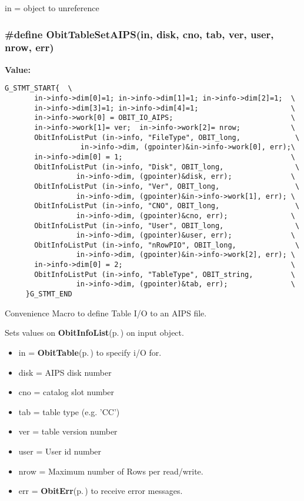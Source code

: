 in = object to unreference 
\subsubsection{\setlength{\rightskip}{0pt plus 5cm}\#define Obit\-Table\-Set\-AIPS(in, disk, cno, tab, ver, user, nrow, err)}\label{ObitTable_8h_a7}


{\bf Value:}

\footnotesize\begin{verbatim}G_STMT_START{  \
       in->info->dim[0]=1; in->info->dim[1]=1; in->info->dim[2]=1;  \
       in->info->dim[3]=1; in->info->dim[4]=1;                      \
       in->info->work[0] = OBIT_IO_AIPS;                            \
       in->info->work[1]= ver;  in->info->work[2]= nrow;            \
       ObitInfoListPut (in->info, "FileType", OBIT_long,             \
                  in->info->dim, (gpointer)&in->info->work[0], err);\
       in->info->dim[0] = 1;                                        \
       ObitInfoListPut (in->info, "Disk", OBIT_long,                 \
                 in->info->dim, (gpointer)&disk, err);              \
       ObitInfoListPut (in->info, "Ver", OBIT_long,                  \
                 in->info->dim, (gpointer)&in->info->work[1], err); \
       ObitInfoListPut (in->info, "CNO", OBIT_long,                  \
                 in->info->dim, (gpointer)&cno, err);               \
       ObitInfoListPut (in->info, "User", OBIT_long,                 \
                 in->info->dim, (gpointer)&user, err);              \
       ObitInfoListPut (in->info, "nRowPIO", OBIT_long,              \
                 in->info->dim, (gpointer)&in->info->work[2], err); \
       in->info->dim[0] = 2;                                        \
       ObitInfoListPut (in->info, "TableType", OBIT_string,         \
                 in->info->dim, (gpointer)&tab, err);               \
     }G_STMT_END
\end{verbatim}\normalsize 
Convenience Macro to define Table I/O to an AIPS file. 

Sets values on {\bf Obit\-Info\-List}{\rm (p.\,\pageref{structObitInfoList})} on input object. \begin{itemize}
\item in = {\bf Obit\-Table}{\rm (p.\,\pageref{structObitTable})} to specify i/O for. \item disk = AIPS disk number \item cno = catalog slot number \item tab = table type (e.g. 'CC') \item ver = table version number \item user = User id number \item nrow = Maximum number of Rows per read/write. \item err = {\bf Obit\-Err}{\rm (p.\,\pageref{structObitErr})} to receive error messages. \end{itemize}
